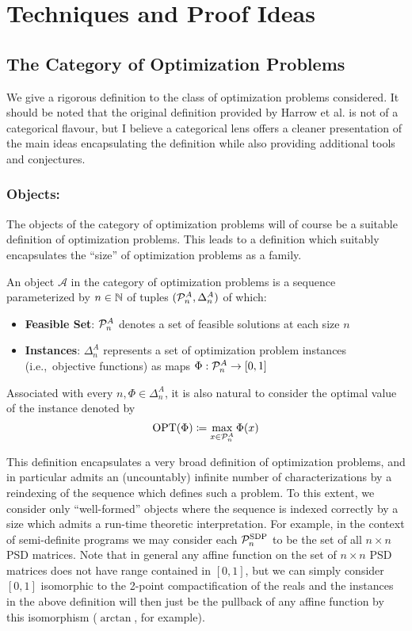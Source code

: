 \documentclass[runningheads,a4paper,english]{llncs}[2022/01/12]
\newcommand{\ie}{i.e.,\ }
\begin{document}
\section{Techniques and Proof Ideas}
\label{sec:techniques}

\subsection{The Category of Optimization Problems}
\label{sec:optimizationdef}
We give a rigorous definition to the class of optimization problems considered. 
It should be noted that the original definition provided by Harrow et al. is not of a categorical flavour, but I believe a categorical lens offers a cleaner presentation of the main ideas encapsulating the definition while also providing additional tools and conjectures.

\subsubsection{Objects:}
The objects of the category of optimization problems will of course be a suitable definition of optimization problems.
This leads to a definition which suitably encapsulates the ``size'' of optimization problems as a family.
\begin{definition}\label{def:optprob:obj}
  An object $\mathscr{A}$ in the category of optimization problems is a sequence parameterized by $n \in \mathbb{N}$ of tuples $(\mathcal{P}_n^A, \Delta_n^A)$ of which:
  \begin{itemize}
    \item \textbf{Feasible Set}: $\mathcal{P}_n^A$ denotes a set of feasible solutions at each size $n$
    \item \textbf{Instances}: $\Delta_n^A$ represents a set of optimization problem instances (\ie objective functions) as maps $\Phi: \mathcal{P}_n^A \to [0,1]$
  \end{itemize}
  Associated with every $n, \Phi \in \Delta_n^A$, it is also natural to consider the optimal value of the instance denoted by
  \[\operatorname{OPT}(\Phi) \coloneq \max_{x\in \mathcal{P}_n^A} \Phi(x)\]
\end{definition}
This definition encapsulates a very broad definition of optimization problems, and in particular admits an (uncountably) infinite number of characterizations by a reindexing of the sequence which defines such a problem.
To this extent, we consider only ``well-formed'' objects where the sequence is indexed correctly by a size which admits a run-time theoretic interpretation.
For example, in the context of semi-definite programs we may consider each $\mathcal{P}_n^{\text{SDP}}$ to be the set of all $n\times n$ PSD matrices.
Note that in general any affine function on the set of $n\times n$ PSD matrices does not have range contained in $[0,1]$, but we can simply consider $[0,1]$ isomorphic to the 2-point compactification of the reals and the instances in the above definition will then just be the pullback of any affine function by this isomorphism ($\arctan$, for example).
\end{document}
